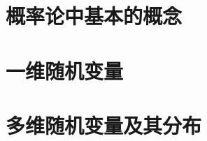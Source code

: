 
\usepackage{ctex}
\usepackage{pifont}
\usepackage{cleveref}






\part{概率论中基本的概念}





\part{一维随机变量}





\part{多维随机变量及其分布}



% 







